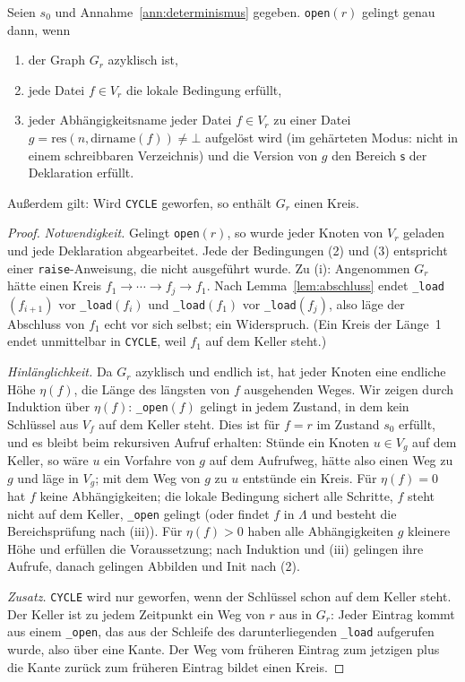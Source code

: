 \begin{satz}
	\label{satz:erfolg}
	Seien $s_0$ und Annahme~\ref{ann:determinismus} gegeben. \texttt{open}$(r)$ gelingt genau dann, wenn
	\begin{enumerate}[label=(\roman*)]
		\item der Graph $G_r$ azyklisch ist,
		\item jede Datei $f\in V_r$ die lokale Bedingung erfüllt,
		\item jeder Abhängigkeitsname jeder Datei $f\in V_r$ zu einer Datei $g=\mathrm{res}(n,\mathrm{dirname}(f))\ne\bot$ aufgelöst wird (im gehärteten Modus: nicht in einem schreibbaren Verzeichnis) und die Version von $g$ den Bereich $\mathsf{s}$ der Deklaration erfüllt.
	\end{enumerate}
	Außerdem gilt: Wird \texttt{CYCLE} geworfen, so enthält $G_r$ einen Kreis.
\end{satz}

\begin{proof}
	\emph{Notwendigkeit.} Gelingt \texttt{open}$(r)$, so wurde jeder Knoten von $V_r$ geladen und jede Deklaration abgearbeitet. Jede der Bedingungen (2) und (3) entspricht einer \texttt{raise}-Anweisung, die nicht ausgeführt wurde. Zu (i): Angenommen $G_r$ hätte einen Kreis $f_1\to\cdots\to f_j\to f_1$. Nach Lemma~\ref{lem:abschluss} endet \texttt{\_load}$(f_{i+1})$ vor \texttt{\_load}$(f_i)$ und \texttt{\_load}$(f_1)$ vor \texttt{\_load}$(f_j)$, also läge der Abschluss von $f_1$ echt vor sich selbst; ein Widerspruch. (Ein Kreis der Länge~1 endet unmittelbar in \texttt{CYCLE}, weil $f_1$ auf dem Keller steht.)

	\emph{Hinlänglichkeit.} Da $G_r$ azyklisch und endlich ist, hat jeder Knoten eine endliche Höhe $\eta(f)$, die Länge des längsten von $f$ ausgehenden Weges. Wir zeigen durch Induktion über $\eta(f)$: \texttt{\_open}$(f)$ gelingt in jedem Zustand, in dem kein Schlüssel aus $V_f$ auf dem Keller steht. Dies ist für $f=r$ im Zustand $s_0$ erfüllt, und es bleibt beim rekursiven Aufruf erhalten: Stünde ein Knoten $u\in V_g$ auf dem Keller, so wäre $u$ ein Vorfahre von $g$ auf dem Aufrufweg, hätte also einen Weg zu $g$ und läge in $V_g$; mit dem Weg von $g$ zu $u$ entstünde ein Kreis. Für $\eta(f)=0$ hat $f$ keine Abhängigkeiten; die lokale Bedingung sichert alle Schritte, $f$ steht nicht auf dem Keller, \texttt{\_open} gelingt (oder findet $f$ in $\Lambda$ und besteht die Bereichsprüfung nach (iii)). Für $\eta(f)>0$ haben alle Abhängigkeiten $g$ kleinere Höhe und erfüllen die Voraussetzung; nach Induktion und (iii) gelingen ihre Aufrufe, danach gelingen Abbilden und Init nach (2).

	\emph{Zusatz.} \texttt{CYCLE} wird nur geworfen, wenn der Schlüssel schon auf dem Keller steht. Der Keller ist zu jedem Zeitpunkt ein Weg von $r$ aus in $G_r$: Jeder Eintrag kommt aus einem \texttt{\_open}, das aus der Schleife des darunterliegenden \texttt{\_load} aufgerufen wurde, also über eine Kante. Der Weg vom früheren Eintrag zum jetzigen plus die Kante zurück zum früheren Eintrag bildet einen Kreis.
\end{proof}


